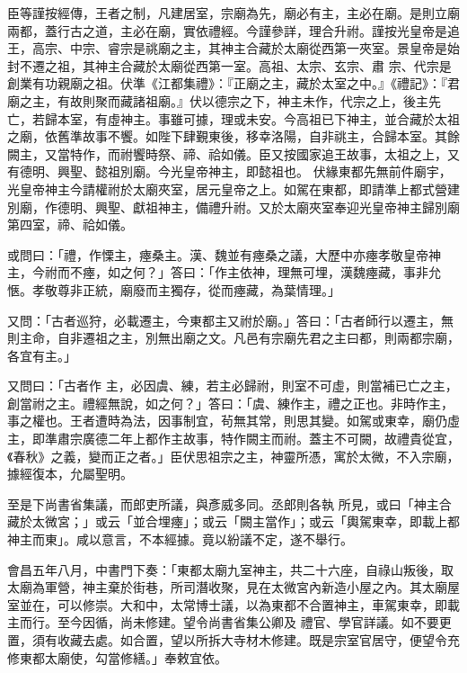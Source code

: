 \begin{pinyinscope}
 臣等謹按經傳，王者之制，凡建居室，宗廟為先，廟必有主，主必在廟。是則立廟兩都，蓋行古之道，主必在廟，實依禮經。今謹參詳，理合升祔。謹按光皇帝是追王，高宗、中宗、睿宗是祧廟之主，其神主合藏於太廟從西第一夾室。景皇帝是始封不遷之祖，其神主合藏於太廟從西第一室。高祖、太宗、玄宗、肅
 宗、代宗是創業有功親廟之祖。伏準《江都集禮》：『正廟之主，藏於太室之中。』《禮記》：『君廟之主，有故則聚而藏諸祖廟。』伏以德宗之下，神主未作，代宗之上，後主先亡，若歸本室，有虛神主。事雖可據，理或未安。今高祖已下神主，並合藏於太祖之廟，依舊準故事不饗。如陛下肆覲東後，移幸洛陽，自非祧主，合歸本室。其餘闕主，又當特作，而祔饗時祭、禘、祫如儀。臣又按國家追王故事，太祖之上，又有德明、興聖、懿祖別廟。今光皇帝神主，即懿祖也。
 伏緣東都先無前件廟宇，光皇帝神主今請權祔於太廟夾室，居元皇帝之上。如駕在東都，即請準上都式營建別廟，作德明、興聖、獻祖神主，備禮升祔。又於太廟夾室奉迎光皇帝神主歸別廟第四室，禘、祫如儀。



 或問曰：「禮，作慄主，瘞桑主。漢、魏並有瘞桑之議，大歷中亦瘞孝敬皇帝神主，今祔而不瘞，如之何？」答曰：「作主依神，理無可埋，漢魏瘞藏，事非允愜。孝敬尊非正統，廟廢而主獨存，從而瘞藏，為葉情理。」



 又問：「古者巡狩，必載遷主，今東都主又祔於廟。」答曰：「古者師行以遷主，無則主命，自非遷祖之主，別無出廟之文。凡邑有宗廟先君之主曰都，則兩都宗廟，各宜有主。」



 又問曰：「古者作
 主，必因虞、練，若主必歸祔，則室不可虛，則當補已亡之主，創當祔之主。禮經無說，如之何？」答曰：「虞、練作主，禮之正也。非時作主，事之權也。王者遭時為法，因事制宜，茍無其常，則思其變。如駕或東幸，廟仍虛主，即準肅宗廣德二年上都作主故事，特作闕主而祔。蓋主不可闕，故禮貴從宜，《春秋》之義，變而正之者。」臣伏思祖宗之主，神靈所憑，寓於太微，不入宗廟，據經復本，允屬聖明。



 至是下尚書省集議，而郎吏所議，與彥威多同。丞郎則各執
 所見，或曰「神主合藏於太微宮；」或云「並合埋瘞」；或云「闕主當作」；或云「輿駕東幸，即載上都神主而東」。咸以意言，不本經據。竟以紛議不定，遂不舉行。



 會昌五年八月，中書門下奏：「東都太廟九室神主，共二十六座，自祿山叛後，取太廟為軍營，神主棄於街巷，所司潛收聚，見在太微宮內新造小屋之內。其太廟屋室並在，可以修崇。大和中，太常博士議，以為東都不合置神主，車駕東幸，即載主而行。至今因循，尚未修建。望令尚書省集公卿及
 禮官、學官詳議。如不要更置，須有收藏去處。如合置，望以所拆大寺材木修建。既是宗室官居守，便望令充修東都太廟使，勾當修繕。」奉敕宜依。




\end{pinyinscope}
